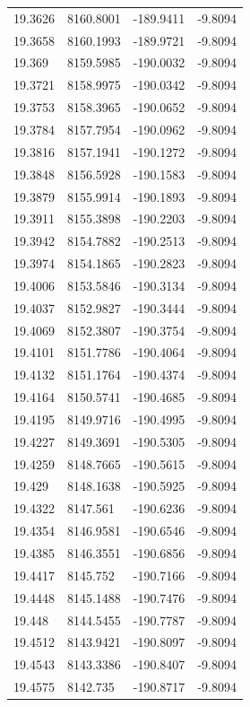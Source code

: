 \begin{table}[H]
\begin{tabular}{llll}
19.3626 & 8160.8001 & -189.9411 & -9.8094 \\
19.3658 & 8160.1993 & -189.9721 & -9.8094 \\
19.369 & 8159.5985 & -190.0032 & -9.8094 \\
19.3721 & 8158.9975 & -190.0342 & -9.8094 \\
19.3753 & 8158.3965 & -190.0652 & -9.8094 \\
19.3784 & 8157.7954 & -190.0962 & -9.8094 \\
19.3816 & 8157.1941 & -190.1272 & -9.8094 \\
19.3848 & 8156.5928 & -190.1583 & -9.8094 \\
19.3879 & 8155.9914 & -190.1893 & -9.8094 \\
19.3911 & 8155.3898 & -190.2203 & -9.8094 \\
19.3942 & 8154.7882 & -190.2513 & -9.8094 \\
19.3974 & 8154.1865 & -190.2823 & -9.8094 \\
19.4006 & 8153.5846 & -190.3134 & -9.8094 \\
19.4037 & 8152.9827 & -190.3444 & -9.8094 \\
19.4069 & 8152.3807 & -190.3754 & -9.8094 \\
19.4101 & 8151.7786 & -190.4064 & -9.8094 \\
19.4132 & 8151.1764 & -190.4374 & -9.8094 \\
19.4164 & 8150.5741 & -190.4685 & -9.8094 \\
19.4195 & 8149.9716 & -190.4995 & -9.8094 \\
19.4227 & 8149.3691 & -190.5305 & -9.8094 \\
19.4259 & 8148.7665 & -190.5615 & -9.8094 \\
19.429 & 8148.1638 & -190.5925 & -9.8094 \\
19.4322 & 8147.561 & -190.6236 & -9.8094 \\
19.4354 & 8146.9581 & -190.6546 & -9.8094 \\
19.4385 & 8146.3551 & -190.6856 & -9.8094 \\
19.4417 & 8145.752 & -190.7166 & -9.8094 \\
19.4448 & 8145.1488 & -190.7476 & -9.8094 \\
19.448 & 8144.5455 & -190.7787 & -9.8094 \\
19.4512 & 8143.9421 & -190.8097 & -9.8094 \\
19.4543 & 8143.3386 & -190.8407 & -9.8094 \\
19.4575 & 8142.735 & -190.8717 & -9.8094 \\

\end{tabular}
\end{table}
